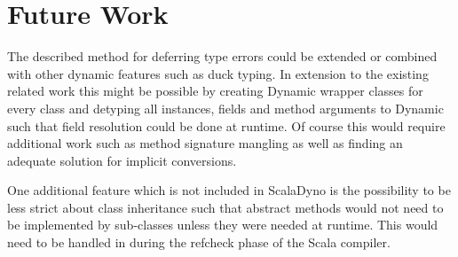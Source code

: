  \section{Future Work}

The described method for deferring type errors could be extended or combined with other dynamic features such as duck typing. In extension to the existing related work this might be possible by creating {\ttfamily Dynamic} wrapper classes for every class and detyping all instances, fields and method arguments to {\ttfamily Dynamic} such that field resolution could be done at runtime. Of course this would require additional work such as method signature mangling as well as finding an adequate solution for implicit conversions.

One additional feature which is not included in ScalaDyno is the possibility to be less strict about class inheritance such that abstract methods would not need to be implemented by sub-classes unless they were needed at runtime. This would need to be handled in during the {\ttfamily refcheck} phase of the Scala compiler.